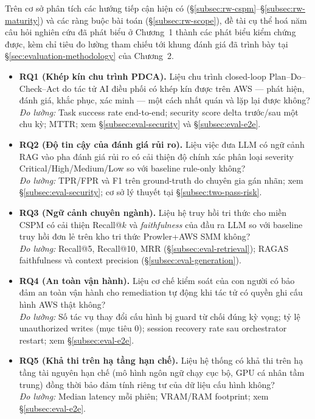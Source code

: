 Trên cơ sở phân tích các hướng tiếp cận hiện có (§\ref{subsec:rw-cspm}--§\ref{subsec:rw-maturity}) và các ràng buộc bài toán (§\ref{subsec:rw-scope}), đề tài cụ thể hoá năm câu hỏi nghiên cứu đã phát biểu ở Chương~1 thành các phát biểu kiểm chứng được, kèm chỉ tiêu đo lường tham chiếu tới khung đánh giá đã trình bày tại §\ref{sec:evaluation-methodology} của Chương~2.

\begin{itemize}
  \item \textbf{RQ1 (Khép kín chu trình PDCA).} Liệu chu trình closed-loop Plan--Do--Check--Act do tác tử AI điều phối có khép kín được trên AWS — phát hiện, đánh giá, khắc phục, xác minh — một cách nhất quán và lặp lại được không?
  \\\textit{Đo lường:} Task success rate end-to-end; security score delta trước/sau một chu kỳ; MTTR; xem §\ref{subsec:eval-security} và §\ref{subsec:eval-e2e}.

  \item \textbf{RQ2 (Độ tin cậy của đánh giá rủi ro).} Liệu việc đưa LLM có ngữ cảnh RAG vào pha đánh giá rủi ro có cải thiện độ chính xác phân loại severity Critical/High/Medium/Low so với baseline rule-only không?
  \\\textit{Đo lường:} TPR/FPR và F1 trên ground-truth do chuyên gia gán nhãn; xem §\ref{subsec:eval-security}; cơ sở lý thuyết tại §\ref{subsec:two-pass-risk}.

  \item \textbf{RQ3 (Ngữ cảnh chuyên ngành).} Liệu hệ truy hồi tri thức cho miền CSPM có cải thiện Recall@$k$ và \textit{faithfulness} của đầu ra LLM so với baseline truy hồi đơn lẻ trên kho tri thức Prowler+AWS SMM không?
  \\\textit{Đo lường:} Recall@5, Recall@10, MRR (§\ref{subsec:eval-retrieval}); RAGAS faithfulness và context precision (§\ref{subsec:eval-generation}).

  \item \textbf{RQ4 (An toàn vận hành).} Liệu cơ chế kiểm soát của con người có bảo đảm an toàn vận hành cho remediation tự động khi tác tử có quyền ghi cấu hình AWS thật không?
  \\\textit{Đo lường:} Số tác vụ thay đổi cấu hình bị guard từ chối đúng kỳ vọng; tỷ lệ unauthorized writes (mục tiêu 0); session recovery rate sau orchestrator restart; xem §\ref{subsec:eval-e2e}.

  \item \textbf{RQ5 (Khả thi trên hạ tầng hạn chế).} Liệu hệ thống có khả thi trên hạ tầng tài nguyên hạn chế (mô hình ngôn ngữ chạy cục bộ, GPU cá nhân tầm trung) đồng thời bảo đảm tính riêng tư của dữ liệu cấu hình không?
  \\\textit{Đo lường:} Median latency mỗi phiên; VRAM/RAM footprint; xem §\ref{subsec:eval-e2e}.
\end{itemize}

